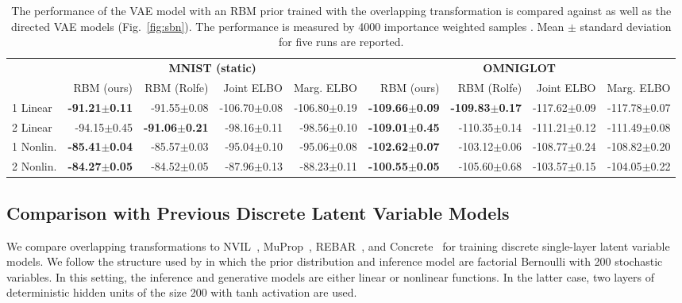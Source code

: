 \documentclass{article}
\begin{document}
\setlength{\tabcolsep}{3pt}   \begin{table*}
\caption{The performance of the VAE model with an RBM prior trained with the overlapping transformation 
is compared against \cite{rolfe2016discrete} as well as the directed VAE models (Fig.~\ref{fig:sbn}). 
The performance is measured by 4000 importance weighted samples \cite{burda2015importance}. Mean $\pm$ standard deviation for five runs are reported.} \label{tab:res_rbm}
\footnotesize
\centering
\begin{tabular}{ l r r r r | r r r r}
\hline
\multicolumn{1}{c}{} & \multicolumn{4}{c|}{\textbf{MNIST (static)}} & \multicolumn{4}{c}{\textbf{OMNIGLOT}} \\
& RBM (ours) & RBM (Rolfe) & Joint ELBO & Marg. ELBO & RBM (ours) & RBM (Rolfe) & Joint ELBO & Marg. ELBO \\
\hline   
1 Linear    & \textbf{-91.21$\pmb{\pm}$0.11} & -91.55$\pm$0.08 & -106.70$\pm$0.08 &  -106.80$\pm$0.19 & \textbf{-109.66$\pmb{\pm}$0.09} & \textbf{-109.83$\pm$0.17} & -117.62$\pm$0.09 & -117.78$\pm$0.07 \\
2 Linear   & -94.15$\pmb{\pm}$0.45 & \textbf{-91.06$\pmb{\pm}$0.21} & -98.16$\pm$0.11  & -98.56$\pm$0.10 & \textbf{-109.01$\pmb{\pm}$0.45} & -110.35$\pm$0.14 & -111.21$\pm$0.12 & -111.49$\pm$0.08 \\
\hline 
1 Nonlin.    & \textbf{-85.41$\pmb{\pm}$0.04} & -85.57$\pm$0.03 & -95.04$\pm$0.10  & -95.06$\pm$0.08 & \textbf{-102.62$\pmb{\pm}$0.07} & -103.12$\pm$0.06 & -108.77$\pm$0.24 & -108.82$\pm$0.20 \\
2 Nonlin.   & \textbf{-84.27$\pmb{\pm}$0.05} & -84.52$\pm$0.05 & -87.96$\pm$0.13  & -88.23$\pm$0.11 & \textbf{-100.55$\pmb{\pm}$0.05} & -105.60$\pm$0.68 & -103.57$\pm$0.15 & -104.05$\pm$0.22 \\
\hline
\end{tabular}
\end{table*}

\subsection{Comparison with Previous Discrete Latent Variable Models} \label{sec:prev_comp}

We compare overlapping transformations to NVIL~\cite{mnih2014neural}, MuProp~\cite{gu2015muprop}, REBAR~\cite{tucker2017rebar}, and Concrete~\cite{maddison2016concrete} for training discrete single-layer latent variable models. 
We follow the structure used by \cite{tucker2017rebar} in which
the prior distribution and inference model are factorial Bernoulli with 200 stochastic variables. In this setting,
the inference and generative models are either linear or nonlinear functions. In the latter case, two layers 
of deterministic hidden units of the size 200 with tanh activation are used.
\end{document}

